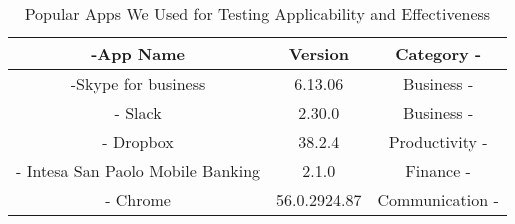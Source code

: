 \begin{table}[H]
\caption{Popular Apps We Used for Testing \asd Applicability and Effectiveness}
\label{tab:realapps}
\centering
{}
\begin{tabular}{>{\kern-\tabcolsep}ccc<{\kern-\tabcolsep}}\toprule
App Name & Version & Category \\
\midrule
Skype for business & 6.13.06&  Business \\
\hline
Slack & 2.30.0 & Business \\
\hline
Dropbox & 38.2.4 & Productivity \\
\hline
Intesa San Paolo Mobile Banking & 2.1.0 & Finance \\
\hline
Chrome & 56.0.2924.87  & Communication \\ 
\bottomrule
\end{tabular}
\end{table}

 